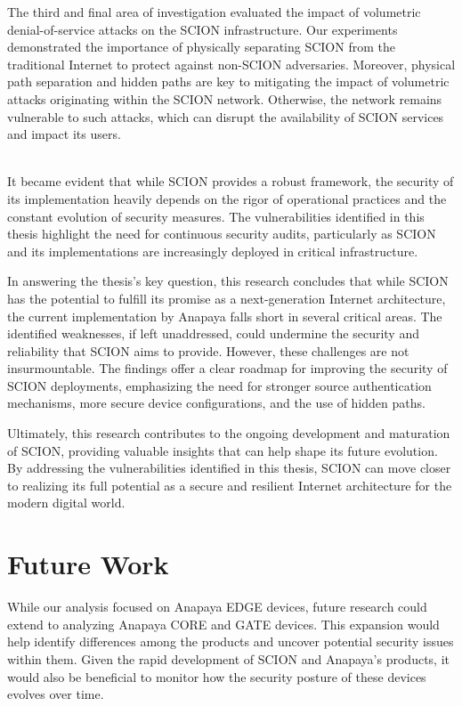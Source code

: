 The third and final area of investigation evaluated the impact of volumetric denial-of-service attacks on the SCION infrastructure.
Our experiments demonstrated the importance of physically separating SCION from the traditional Internet to protect against non-SCION adversaries.
Moreover, physical path separation and hidden paths are key to mitigating the impact of volumetric attacks originating within the SCION network.
Otherwise, the network remains vulnerable to such attacks, which can disrupt the availability of SCION services and impact its users.

\\
It became evident that while SCION provides a robust framework, the security of its implementation heavily depends on the rigor of operational practices and the constant evolution of security measures.
The vulnerabilities identified in this thesis highlight the need for continuous security audits, particularly as SCION and its implementations are increasingly deployed in critical infrastructure.

In answering the thesis's key question, this research concludes that while SCION has the potential to fulfill its promise as a next-generation Internet architecture, the current implementation by Anapaya falls short in several critical areas.
The identified weaknesses, if left unaddressed, could undermine the security and reliability that SCION aims to provide.
However, these challenges are not insurmountable.
The findings offer a clear roadmap for improving the security of SCION deployments, emphasizing the need for stronger source authentication mechanisms, more secure device configurations, and the use of hidden paths.

Ultimately, this research contributes to the ongoing development and maturation of SCION, providing valuable insights that can help shape its future evolution.
By addressing the vulnerabilities identified in this thesis, SCION can move closer to realizing its full potential as a secure and resilient Internet architecture for the modern digital world.


\section{Future Work}

While our analysis focused on Anapaya EDGE devices, future research could extend to analyzing Anapaya CORE and GATE devices.
This expansion would help identify differences among the products and uncover potential security issues within them.
Given the rapid development of SCION and Anapaya's products, it would also be beneficial to monitor how the security posture of these devices evolves over time.

